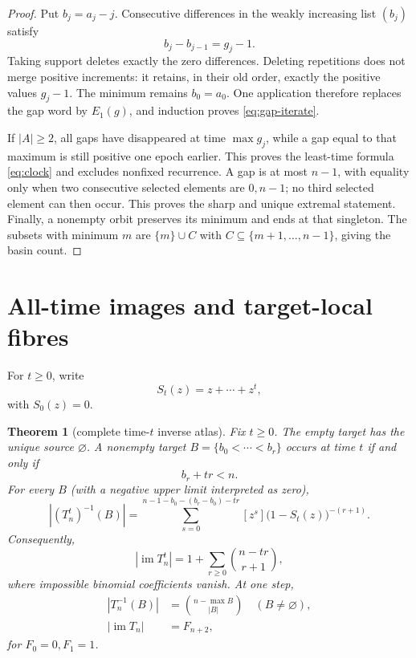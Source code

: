 \documentclass[a4paper,10pt]{amsart}
\newtheorem{theorem}{Theorem}
\theoremstyle{remark}
\newcommand{\im}{\operatorname{im}}
\begin{document}
\begin{proof}
Put $b_j=a_j-j$.  Consecutive differences in the weakly increasing list
$(b_j)$ satisfy
\begin{equation}\label{eq:difference}
                 b_j-b_{j-1}=g_j-1.
\end{equation}
Taking support deletes exactly the zero differences.  Deleting repetitions
does not merge positive increments: it retains, in their old order, exactly
the positive values $g_j-1$.  The minimum remains $b_0=a_0$.  One application
therefore replaces the gap word by $E_1(g)$, and induction proves
\eqref{eq:gap-iterate}.

If $|A|\ge2$, all gaps have disappeared at time $\max g_j$, while a gap
equal to that maximum is still positive one epoch earlier.  This proves the
least-time formula \eqref{eq:clock} and excludes nonfixed recurrence.  A gap
is at most $n-1$, with equality only when two consecutive selected elements
are $0,n-1$; no third selected element can then occur.  This proves the
sharp and unique extremal statement.  Finally, a nonempty orbit preserves
its minimum and ends at that singleton.  The subsets with minimum $m$ are
$\{m\}\cup C$ with $C\subseteq\{m+1,\ldots,n-1\}$, giving the basin count.
\end{proof}

\section{All-time images and target-local fibres}

For $t\ge0$, write
\begin{equation}\label{eq:short-series}
 S_t(z)=z+\cdots+z^t,
\end{equation}
with $S_0(z)=0$.

\begin{theorem}[complete time-$t$ inverse atlas]\label{thm:fibre}
Fix $t\ge0$.  The empty target has the unique source $\varnothing$.  A
nonempty target $B=\{b_0<\cdots<b_r\}$ occurs at time $t$ if and only if
\begin{equation}\label{eq:image-condition}
                  b_r+tr<n.
\end{equation}
For every $B$ (with a negative upper limit interpreted as zero),
\begin{equation}\label{eq:fibre}
 |(T_n^t)^{-1}(B)|=
 \sum_{s=0}^{n-1-b_0-(b_r-b_0)-tr}
 [z^s]\bigl(1-S_t(z)\bigr)^{-(r+1)}.
\end{equation}
Consequently,
\begin{equation}\label{eq:image-size}
 |\im T_n^t|=1+\sum_{r\ge0}\binom{n-tr}{r+1},
\end{equation}
where impossible binomial coefficients vanish.  At one step,
\begin{align}
 |T_n^{-1}(B)|&=\binom{n-\max B}{|B|}\quad(B\ne\varnothing),
 \label{eq:first-fibre}\\
 |\im T_n|&=F_{n+2},                                      \label{eq:fibonacci}
\end{align}
for $F_0=0,F_1=1$.
\end{theorem}
\end{document}
